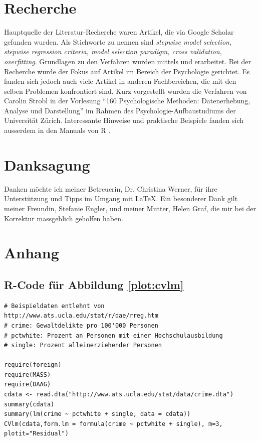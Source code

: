 \documentclass[german,12pt,doc]{apa}
\begin{document}


\section{Recherche}
Hauptquelle der Literatur-Recherche waren Artikel, die via Google Scholar gefunden wurden. Als Stichworte zu nennen sind \textit{stepwise model selection, stepwise regression criteria, model selection paradigm, cross validation, overfitting}. Grundlagen zu den Verfahren wurden mittels  und  erarbeitet. Bei der Recherche wurde der Fokus auf Artikel im Bereich der Psychologie gerichtet. Es fanden sich jedoch auch  viele Artikel in anderen Fachbereichen, die mit den selben Problemen konfrontiert sind. Kurz vorgestellt wurden die Verfahren von Carolin Strobl in der Vorlesung ``160 Psychologische Methoden: Datenerhebung, Analyse und Darstellung'' im Rahmen des Psychologie-Aufbaustudiums der Universität Zürich. Interessante Hinweise und praktische Beispiele fanden sich ausserdem in den Manuals von R \cite{R:core}.








\section*{Danksagung}
Danken möchte ich meiner Betreuerin, Dr. Christina Werner, für ihre Unterstützung und Tipps im Umgang mit \LaTeX. Ein besonderer Dank gilt meiner Freundin, Stefanie Engler, und meiner Mutter, Helen Graf, die mir bei der Korrektur massgeblich geholfen haben.  
\newpage
\printglossaries 
\newpage
 



\newpage
\section{Anhang}
\subsection*{R-Code für Abbildung \ref{plot:cvlm}}
\begin{verbatim}
# Beispieldaten entlehnt von http://www.ats.ucla.edu/stat/r/dae/rreg.htm
# crime: Gewaltdelikte pro 100'000 Personen
# pctwhite: Prozent an Personen mit einer Hochschulausbildung
# single: Prozent alleinerziehender Personen

require(foreign)
require(MASS)
require(DAAG)
cdata <- read.dta("http://www.ats.ucla.edu/stat/data/crime.dta")
summary(cdata)
summary(lm(crime ~ pctwhite + single, data = cdata))
CVlm(cdata,form.lm = formula(crime ~ pctwhite + single), m=3, plotit="Residual")
\end{verbatim}
\newpage
\end{document}
